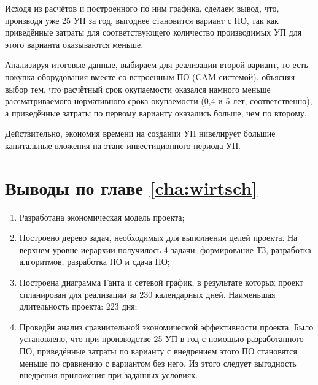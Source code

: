 Исходя из расчётов и построенного по ним графика, сделаем вывод, что, производя уже 25 УП за год, выгоднее становится вариант с ПО, так как приведённые затраты для соответствующего количество производимых УП для этого варианта оказываются меньше.

Анализируя итоговые данные, выбираем для реализации второй вариант, то есть покупка оборудования вместе со встроенным ПО (CAM-системой), объясняя выбор тем, что расчётный срок окупаемости оказался намного меньше рассматриваемого нормативного срока окупаемости (0,4 и 5 лет, соответственно), а приведённые затраты по первому варианту оказались больше, чем по второму.

Действительно, экономия времени на создании УП нивелирует большие капитальные вложения на этапе инвестиционного периода УП.

\section{Выводы по главе \ref{cha:wirtsch}}

\begin{enumerate}[1)]
	\item Разработана экономическая модель проекта;
	\item Построено дерево задач, необходимых для выполнения целей проекта. На верхнем уровне иерархии получилось 4 задачи: формирование ТЗ, разработка алгоритмов, разработка ПО и сдача ПО;
	\item Построена диаграмма Ганта и сетевой график,  в результате которых проект спланирован для реализации за 230 календарных дней. Наименьшая длительность проекта: 223 дня;
	\item Проведён анализ сравнительной экономической эффективности проекта. Было установлено, что при производстве 25 УП в год с помощью разработанного ПО, приведённые затраты по варианту с внедрением этого ПО становятся меньше по сравнению с вариантом без него. Из этого следует выгодность внедрения приложения при заданных условиях.
\end{enumerate}


